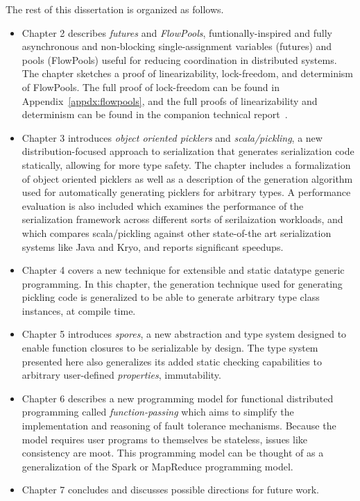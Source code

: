 The rest of this dissertation is organized as follows.

\begin{itemize}

	\item Chapter 2 describes {\em futures} and {\em FlowPools}, funtionally-inspired
	and fully asynchronous and non-blocking single-assignment variables (futures)
	and pools (FlowPools) useful for reducing coordination in distributed systems.
	The chapter sketches a proof of linearizability, lock-freedom, and determinism
	of FlowPools. The full proof of lock-freedom can be found in
	Appendix~\ref{appdx:flowpools}, and the full proofs of linearizability and
	determinism can be found in the companion technical report~\cite{Prokopec12}.

	\item Chapter 3 introduces {\em object oriented picklers} and {\em
	scala/pickling}, a new distribution-focused approach to serialization that
	generates serialization code statically, allowing for more type safety. The
	chapter includes a formalization of object oriented picklers as well as a
	description of the generation algorithm used for automatically generating
	picklers for arbitrary types. A performance evaluation is also included which
	examines the performance of the serialization framework across different sorts
	of serilaization workloads, and which compares scala/pickling against other
	state-of-the art serialization systems like Java and Kryo, and reports
	significant speedups.

	\item Chapter 4 covers a new technique for extensible and static datatype
	generic programming. In this chapter, the generation technique used for
	generating pickling code is generalized to be able to generate arbitrary type
	class instances, at compile time.

	\item Chapter 5 introduces {\em spores}, a new abstraction and type system
	designed to enable function closures to be serializable by design. The type
	system presented here also generalizes its added static checking capabilities
	to arbitrary user-defined {\em properties}, \eg immutability.

	\item Chapter 6 describes a new programming model for functional distributed
	programming called {\em function-passing} which aims to simplify the
	implementation and reasoning of fault tolerance mechanisms. Because the model
	requires user programs to themselves be stateless, issues like consistency are
	moot. This programming model can be thought of as a generalization of the Spark
	or MapReduce programming model.

	\item Chapter 7 concludes and discusses possible directions for future work.

\end{itemize}

